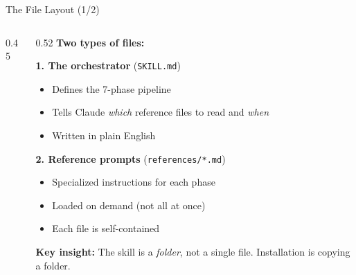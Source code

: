 \documentclass[10pt,english,aspectratio=169]{beamer}
\begin{document}
\begin{frame}[fragile]{The File Layout (1/2)}

\begin{columns}[T]
\begin{column}{0.45\textwidth}
\end{column}

\begin{column}{0.52\textwidth}
\textbf{Two types of files:}

\vspace{0.2cm}
\textbf{1. The orchestrator} (\texttt{SKILL.md})
\begin{itemize}
    \item Defines the 7-phase pipeline
    \item Tells Claude \emph{which} reference files to read and \emph{when}
    \item Written in plain English
\end{itemize}

\vspace{0.2cm}
\textbf{2. Reference prompts} (\texttt{references/*.md})
\begin{itemize}
    \item Specialized instructions for each phase
    \item Loaded on demand (not all at once)
    \item Each file is self-contained
\end{itemize}

\vspace{0.2cm}
\textbf{Key insight:} The skill is a \emph{folder}, not a single file. Installation is copying a folder.
\end{column}
\end{columns}

\end{frame}
\end{document}
